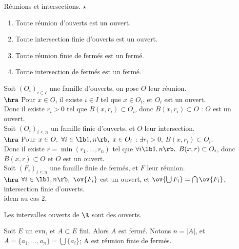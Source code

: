\documentclass[11pt]{article}
\begin{document}
\begin{prop}{Réunions et intersections. $\star$}{}
    \begin{enumerate}
        \item Toute réunion d'ouverts est un ouvert.
        \item Toute intersection finie d'ouverts est un ouvert.
        \item Toute réunion finie de fermés est un fermé.
        \item Toute intersection de fermés est un fermé.
    \end{enumerate}
    \tcblower
     Soit $(O_i)_{i\in I}$ une famille d'ouverts, on pose $O$ leur réunion.\\
    $\hra$ Pour $x\in O$, il existe $i\in I$ tel que $x\in O_i$, et $O_i$ est un ouvert.\\
    Donc il existe $r_i > 0$ tel que $B(x,r_i)\subset O_i$, donc $B(x,r_i)\subset O$ : $O$ est un ouvert.\\
     Soit $(O_i)_{i\leq n}$ un famille finie d'ouverts, et $O$ leur intersection.\\
    $\hra$ Pour $x\in O, ~ \forall i \in \lb1,n\rb, ~ x \in O_i$ : $\exists r_i > 0, ~ B(x,r_i)\subset O_i$.\\
    Donc il existe $r=\min(r_1,...,r_n)$ tel que $\forall i\lb1,n\rb, ~ B(x,r)\subset O_i$, donc $B(x,r)\subset O$ et $O$ est un ouvert.\\
     Soit $(F_i)_{i \leq n}$ une famille finie de fermés, et $F$ leur réunion.\\
    $\hra$ $\forall i \in \lb1,n\rb, ~ \ov{F_i}$ est un ouvert, et $\ov{\bigcup F_i}=\bigcap\ov{F_i}$, intersection finie d'ouverts.\\
     idem au cas 2.
\end{prop}

\begin{ex}{}{}
    Les intervalles ouverts de $\R$ sont des ouverts.
\end{ex}

\vspace*{-0.8cm}

\begin{prop}{}{}
    Soit $E$ un evn, et $A\subset E$ fini. Alors $A$ est fermé.
    \tcblower
    Notons $n=|A|$, et $A=\{a_1,...,a_n\}=\bigcup \{a_i\}$; A est réunion finie de fermés.
\end{prop}

\vspace*{-0.8cm}
\end{document}
